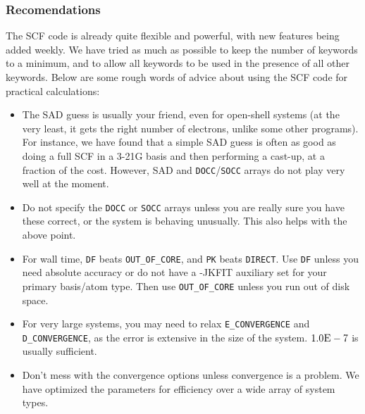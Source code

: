 \subsubsection{Recomendations}

The SCF code is already quite flexible and powerful, with new features being
added weekly. We have tried as much as possible to keep the number of keywords
to a minimum, and to allow all keywords to be used in the presence of all other
keywords. Below are some rough words of advice about using the SCF code for
practical calculations:
\begin{itemize}
\item The SAD guess is usually your friend, even for open-shell systems (at the
very least, it gets the right number of electrons, unlike some other programs).
For instance, we have found that a simple SAD guess is often as good as doing a
full SCF in a 3-21G basis and then performing a cast-up, at a fraction of the
cost.  However, SAD and \texttt{DOCC}/\texttt{SOCC} arrays do not play very well
at the moment. 
\item Do not specify the \texttt{DOCC} or \texttt{SOCC} arrays unless you are
really sure you have these correct, or the system is behaving unusually. 
This also helps with the above point.
\item For wall time, \texttt{DF} beats \texttt{OUT\_OF\_CORE}, and 
\texttt{PK} beats
\texttt{DIRECT}. Use \texttt{DF} unless you need absolute accuracy or do not
have a -JKFIT auxiliary set for your primary basis/atom type. Then use
\texttt{OUT\_OF\_CORE} unless you run out of disk space.
\item For very large systems, you may need to relax \texttt{E\_CONVERGENCE} and
\texttt{D\_CONVERGENCE}, as the error is extensive in the size of the system.
$1.0\textsc{E}-7$ is usually sufficient.  
\item Don't mess with the convergence options unless convergence is a problem.
We have optimized the parameters for efficiency over a wide array of system
types.  
\end{itemize} 
